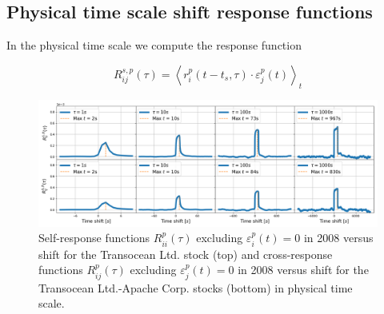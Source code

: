 \subsection{Physical time scale shift response functions}
\label{subsec:time_shift_physical}

In the physical time scale we compute the response function

\begin{equation}\label{eq:time_shift_physical}
    R_{ij}^{s, p}\left(\tau\right)=\left\langle r^{p}_{i}
    \left(t-t_{s},\tau\right) \cdot\varepsilon^{p}_{j}
    \left(t\right)\right\rangle _{t}
\end{equation}

\begin{figure}[htbp]
    \centering
    \includegraphics[width=\textwidth]{figures/04_shift_physical_RIG_APA.png}
    \caption{Self-response functions $R_{ii}^{p}\left(\tau\right)$ excluding
             $\varepsilon^{p}_{i}\left(t\right) = 0$ in 2008 versus shift for
             the Transocean Ltd. stock (top) and cross-response functions
             $R_{ij}^{p}\left(\tau\right)$ excluding
             $\varepsilon^{p}_{j}\left(t\right) = 0$ in 2008 versus shift for
             the Transocean Ltd.-Apache Corp. stocks (bottom) in physical time
             scale.}
    \label{fig:shift_physical_scale}
\end{figure}

